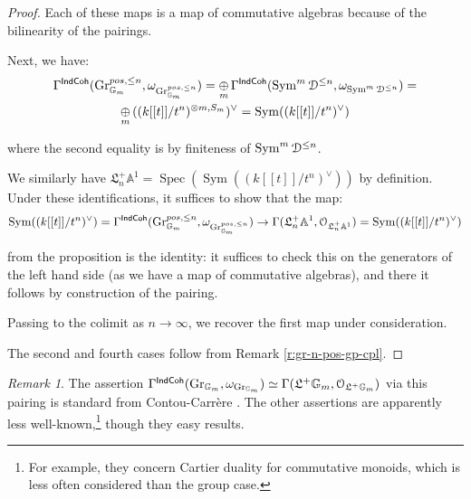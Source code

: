 \documentclass[reqno,11pt]{amsart}
\numberwithin{equation}{subsection}
\theoremstyle{remark}
\newtheorem{rem}[thm]{Remark}
\newcommand{\bA}{{\mathbb A}}
\newcommand{\bG}{{\mathbb G}}
\newcommand{\sD}{{\EuScript D}}
\newcommand{\sO}{{\EuScript O}}
\newcommand{\fL}{{\mathfrak L}}
\newcommand{\on}{\operatorname}
\newcommand{\Spec}{\on{Spec}}
\newcommand{\Gr}{\on{Gr}}
\newcommand{\Sym}{\on{Sym}}
\newcommand{\IndCoh}{\mathsf{IndCoh}}
\begin{document}
\begin{proof}

Each of these maps is a map of commutative algebras
because of the bilinearity of the pairings.

Next, we have:
%
\[
\begin{gathered}
\Gamma^{\IndCoh}(\Gr_{\bG_m}^{pos,\leq n},\omega_{\Gr_{\bG_m}^{pos,\leq n}}) =
\underset{m}{\oplus} \,
\Gamma^{\IndCoh}(\Sym^m\sD^{\leq n},\omega_{\Sym^m\sD^{\leq n}})
= \\
\underset{m}{\oplus} \, ((k[[t]]/t^n)^{\otimes m,S_m})^{\vee}
= \Sym((k[[t]]/t^n)^{\vee})
\end{gathered}
\]

\noindent where the second equality is by finiteness of
$\Sym^m \sD^{\leq n}$.

We similarly have 
$\fL_n^+ \bA^1 = \Spec(\Sym((k[[t]]/t^n)^{\vee}))$ by 
definition. Under these identifications, it suffices to
show that the map:
%
\[
\Sym((k[[t]]/t^n)^{\vee}) = 
\Gamma^{\IndCoh}(\Gr_{\bG_m}^{pos,\leq n},\omega_{\Gr_{\bG_m}^{pos,\leq n}}) 
\to \Gamma(\fL_n^+ \bA^1,\sO_{\fL_n^+ \bA^1}) =
\Sym((k[[t]]/t^n)^{\vee})
\]

\noindent from the proposition is the identity: 
it suffices to check this on
the generators of the left hand side (as we have a map
of commutative algebras), and there it follows 
by construction of the pairing.

Passing to the colimit as $n \to \infty$, we recover
the first map under consideration.

The second and fourth cases follow from Remark \ref{r:gr-n-pos-gp-cpl}.

\end{proof}

\begin{rem}

The assertion $\Gamma^{\IndCoh}(\Gr_{\bG_m},\omega_{\Gr_{\bG_m}}) 
\simeq \Gamma(\fL^+ \bG_m,\sO_{\fL^+ \bG_m})$ via this
pairing is standard from Contou-Carr\`ere \cite{cc}. 
The other assertions
are apparently less well-known,\footnote{For example,
they concern Cartier duality for commutative monoids,
which is less often considered than the group case.}
though they easy results.

\end{rem}

%
\end{document}
